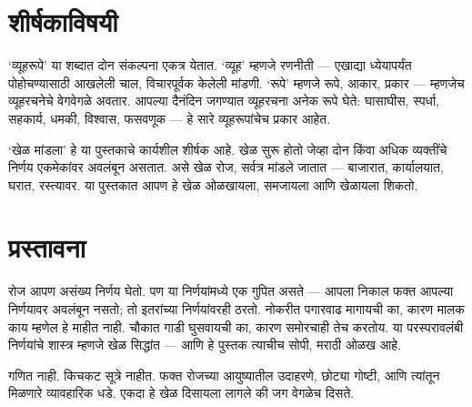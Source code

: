 \clearpage

\chapter*{शीर्षकाविषयी}
`व्यूहरूपे' या शब्दात दोन संकल्पना एकत्र येतात. `व्यूह' म्हणजे रणनीती — एखाद्या ध्येयापर्यंत पोहोचण्यासाठी आखलेली चाल, विचारपूर्वक केलेली मांडणी. `रूपे' म्हणजे रूपे, आकार, प्रकार — म्हणजेच व्यूहरचनेचे वेगवेगळे अवतार. आपल्या दैनंदिन जगण्यात व्यूहरचना अनेक रूपे घेते: घासाघीस, स्पर्धा, सहकार्य, धमकी, विश्वास, फसवणूक — हे सारे व्यूहरूपांचेच प्रकार आहेत.

`खेळ मांडला' हे या पुस्तकाचे कार्यशील शीर्षक आहे. खेळ सुरू होतो जेव्हा दोन किंवा अधिक व्यक्तींचे निर्णय एकमेकांवर अवलंबून असतात. असे खेळ रोज, सर्वत्र मांडले जातात — बाजारात, कार्यालयात, घरात, रस्त्यावर. या पुस्तकात आपण हे खेळ ओळखायला, समजायला आणि खेळायला शिकतो.

\chapter*{प्रस्तावना}
रोज आपण असंख्य निर्णय घेतो. पण या निर्णयांमध्ये एक गुपित असते — आपला निकाल फक्त आपल्या निर्णयावर अवलंबून नसतो; तो इतरांच्या निर्णयांवरही ठरतो. नोकरीत पगारवाढ मागायची का, कारण मालक काय म्हणेल हे माहीत नाही. चौकात गाडी घुसवायची का, कारण समोरचाही तेच करतोय. या परस्परावलंबी निर्णयांचे शास्त्र म्हणजे खेळ सिद्धांत — आणि हे पुस्तक त्याचीच सोपी, मराठी ओळख आहे.

गणित नाही. किचकट सूत्रे नाहीत. फक्त रोजच्या आयुष्यातील उदाहरणे, छोट्या गोष्टी, आणि त्यांतून मिळणारे व्यावहारिक धडे. एकदा हे खेळ दिसायला लागले की जग वेगळेच दिसते.
